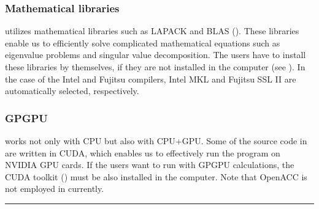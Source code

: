 \documentclass[a4paper,11pt,oneside,english]{sphinxmanual}
\begin{document}
\subsubsection{Mathematical libraries}
\label{\detokenize{01_Getting_Started:mathematical-libraries}}
 utilizes mathematical libraries such as LAPACK and BLAS ().
These libraries enable us to efficiently solve complicated mathematical
equations such as eigenvalue problems and singular value decomposition.
The users have to install these libraries by themselves,
if they are not installed in the computer (see {\hyperref[\detokenize{98_Appendix:appendix}]{}}).
In the case of the Intel and Fujitsu compilers, Intel MKL and Fujitsu SSL II are automatically selected, respectively.


\subsubsection{GPGPU}
\label{\detokenize{01_Getting_Started:gpgpu}}
 works not only with CPU but also with CPU+GPU.
Some of the source code in  are written in CUDA,
which enables us to effectively run the program on NVIDIA GPU cards.
If the users want to run  with GPGPU calculations,
the CUDA toolkit () must be also installed in the computer.
Note that OpenACC is not employed in  currently.


\bigskip\hrule\bigskip
\end{document}
